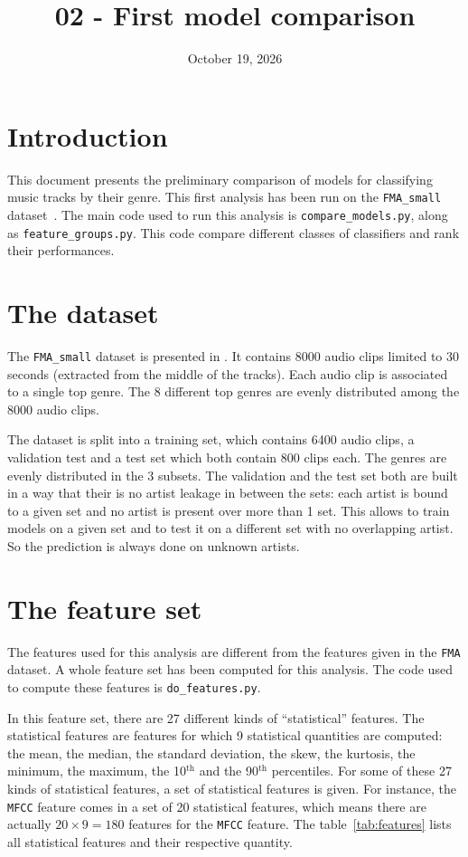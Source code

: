\documentclass[11pt]{article}
\title{02 - First model  comparison}
\author{}
\date{October 19, 2026}
\begin{document}
\maketitle

\section{Introduction}
This document presents the preliminary comparison of models for classifying music tracks by their genre. 
This first analysis has been run on the \texttt{FMA\_small} dataset~\cite{fma_dataset}.
The main code used to run this analysis is \texttt{compare\_models.py}, along as \texttt{feature\_groups.py}. This code compare different classes of classifiers and rank their performances.

\section{The dataset}
The \texttt{FMA\_small} dataset is presented in \cite{fma_dataset}. It contains 8000 audio clips limited to 30 seconds (extracted from the middle of the tracks). Each audio clip is associated to a single top genre. The 8 different top genres are evenly distributed among the 8000 audio clips.

The dataset is split into a training set, which contains 6400 audio clips, a validation test and a test set which both contain 800 clips each. The genres are evenly distributed in the 3 subsets. The validation and the test set both are built in a way that their is no artist leakage in between the sets: each artist is bound to a given set and no artist is present over more than 1 set. This allows to train models on a given set and to test it on a different set with no overlapping artist. So the prediction is always done on unknown artists.

\section{The feature set}
The features used for this analysis are different from the features given in the \texttt{FMA} dataset. A whole feature set has been computed for this analysis. The code used to compute these features is \texttt{do\_features.py}.

In this feature set, there are 27 different kinds of ``statistical'' features. The statistical features are features for which 9 statistical quantities are computed: the mean, the median, the standard deviation, the skew, the kurtosis, the minimum, the maximum, the 10$^{\mathrm{th}}$ and the 90$^{\mathrm{th}}$ percentiles. For some of these 27 kinds of statistical features, a set of statistical features is given. For instance, the \texttt{MFCC} feature comes in a set of 20 statistical features, which means there are actually $20 \times 9 = 180$ features for the \texttt{MFCC} feature.
The table~\ref{tab:features} lists all statistical features and their respective quantity. 
\end{document}
